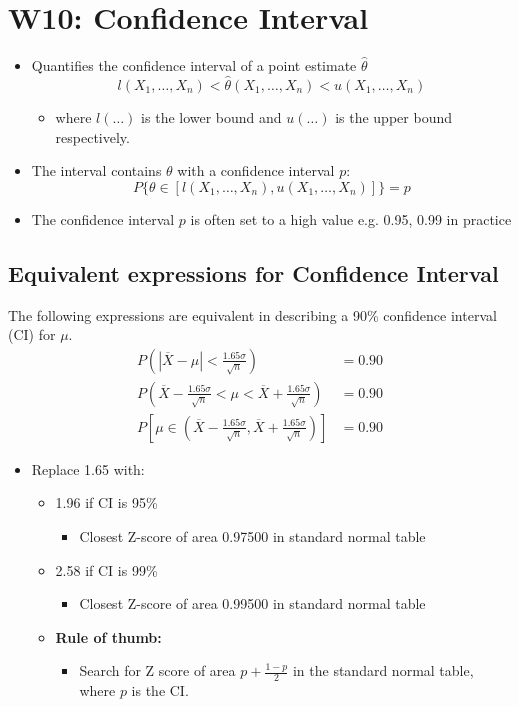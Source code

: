 \documentclass[a4paper]{article}
\begin{document}
\section{W10: Confidence Interval}
\begin{itemize}
    \item Quantifies the confidence interval of a point estimate $\hat{\theta}$
    $$l(X_{1}, \ldots, X_{n})< \hat{\theta}(X_{1}, \ldots, X_{n})<u(X_{1}, \ldots, X_{n})$$
    \begin{itemize}[label=$\circ$]
        \item where $l(\ldots)$ is the lower bound and $u(\ldots)$ is the upper bound respectively. 
    \end{itemize}
    \item The interval contains $\theta$ with a confidence interval $p$:
    $$P\{\theta\in \left[l(X_{1},\ldots, X_{n}), u(X_{1}, \ldots, X_{n})\right] \} = p
    $$
    \item The confidence interval $p$ is often set to a high value e.g. 0.95, 0.99 in practice
\end{itemize}
\subsection{Equivalent expressions for Confidence Interval}
The following expressions are equivalent in describing a 90\% confidence interval (CI) for $\mu$.
\begin{align*}
    P\left(|\overline{X}-\mu| < \frac{1.65\sigma}{\sqrt{n}}\right) &= 0.90\\
    P\left(\overline{X}-\frac{1.65\sigma}{\sqrt{n}}<\mu<\overline{X}+\frac{1.65\sigma}{\sqrt{n}}\right) &= 0.90\\
    P\left[\mu\in\left(\overline{X}-\frac{1.65\sigma}{\sqrt{n}},\overline{X}+\frac{1.65\sigma}{\sqrt{n}}\right)\right] &= 0.90
\end{align*}
\begin{itemize}
    \item Replace 1.65 with:
    \begin{itemize}[label=$\circ$]
        \item 1.96 if CI is 95\%
        \begin{itemize}[label=\tiny$\blacksquare$]
            \item Closest Z-score of area 0.97500 in standard normal table
        \end{itemize}
        \item 2.58 if CI is 99\%
        \begin{itemize}[label=\tiny$\blacksquare$]
            \item Closest Z-score of area 0.99500 in standard normal table
        \end{itemize}
        \item \textbf{Rule of thumb:} 
        \begin{itemize}[label=\tiny$\blacksquare$]
            \item Search for Z score of area $p+\frac{1-p}{2}$ in the standard normal table, where $p$ is the CI.
        \end{itemize}
    \end{itemize}
\end{itemize}
\end{document}
